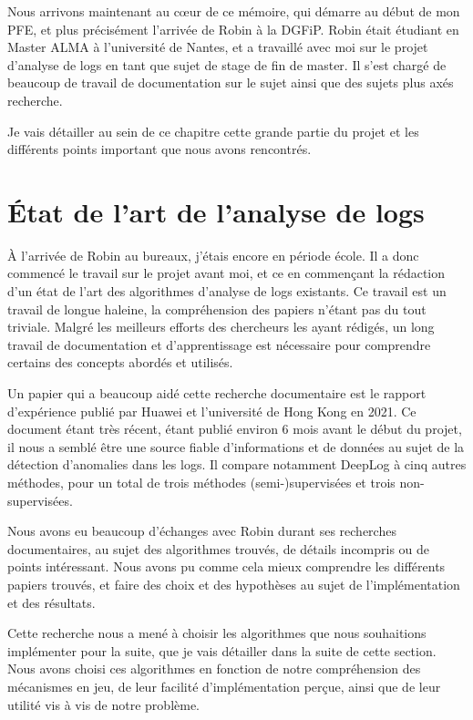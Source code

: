 \documentclass[openany, 12pt]{memoir}
\begin{document}
Nous arrivons maintenant au cœur de ce mémoire, qui démarre au début de mon PFE, et plus précisément l'arrivée de Robin à la \gls{DGFiP}. Robin était étudiant en Master ALMA à l'université de Nantes, et a travaillé avec moi sur le projet d'analyse de \glspl{log} en tant que sujet de stage de fin de master. Il s'est chargé de beaucoup de travail de documentation sur le sujet ainsi que des sujets plus axés recherche.

Je vais détailler au sein de ce chapitre cette grande partie du projet et les différents points important que nous avons rencontrés.

\section{État de l'art de l'analyse de logs}

À l'arrivée de Robin au bureaux, j'étais encore en période école. Il a donc commencé le travail sur le projet avant moi, et ce en commençant la rédaction d'un état de l'art des algorithmes d'analyse de \glspl{log} existants. Ce travail est un travail de longue haleine, la compréhension des papiers n'étant pas du tout triviale. Malgré les meilleurs efforts des chercheurs les ayant rédigés, un long travail de documentation et d'apprentissage est nécessaire pour comprendre certains des concepts abordés et utilisés.

Un papier qui a beaucoup aidé cette recherche documentaire est le rapport d'expérience \cite{experiencereport} publié par Huawei et l'université de Hong Kong en 2021. Ce document étant très récent, étant publié environ 6 mois avant le début du projet, il nous a semblé être une source fiable d'informations et de données au sujet de la détection d'anomalies dans les logs. Il compare notamment DeepLog à cinq autres méthodes, pour un total de trois méthodes (semi-)supervisées et trois non-supervisées.

Nous avons eu beaucoup d'échanges avec Robin durant ses recherches documentaires, au sujet des algorithmes trouvés, de détails incompris ou de points intéressant. Nous avons pu comme cela mieux comprendre les différents papiers trouvés, et faire des choix et des hypothèses au sujet de l'implémentation et des résultats.

\bigskip
Cette recherche nous a mené à choisir les algorithmes que nous souhaitions implémenter pour la suite, que je vais détailler dans la suite de cette section. Nous avons choisi ces algorithmes en fonction de notre compréhension des mécanismes en jeu, de leur facilité d'implémentation perçue, ainsi que de leur utilité vis à vis de notre problème.
\end{document}
